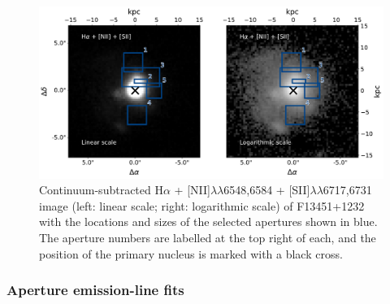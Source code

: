 \begin{figure}[!t]
    \centering
    \includegraphics[width=\linewidth, trim={0cm 0 0 0cm}, clip]{figures/muse_f13451_1232/halpha_sii_image_apertures.pdf}
    \caption[Continuum-subtracted H$\alpha$ + {[}NII{]}$\lambda\lambda$6548,6584 + {[}SII{]}$\lambda\lambda$6717,6731 images of F13451+1232, with the locations and sizes of extracted apertures shown.]{Continuum-subtracted H$\alpha$ + [NII]$\lambda\lambda$6548,6584 + [SII]$\lambda\lambda$6717,6731 image (left: linear scale; right: logarithmic scale) of F13451+1232 with the locations and sizes of the selected apertures shown in blue. The aperture numbers are labelled at the top right of each, and the position of the primary nucleus is marked with a black cross.}
    \label{fig: muse_f13451_1232: analysis_and_results: extended_emission: apertures}
\end{figure}


\subsubsection{Aperture emission-line fits}
\label{section: muse_f13451_1232: analysis_and_results: extended_emission: aperture_line_fits}

